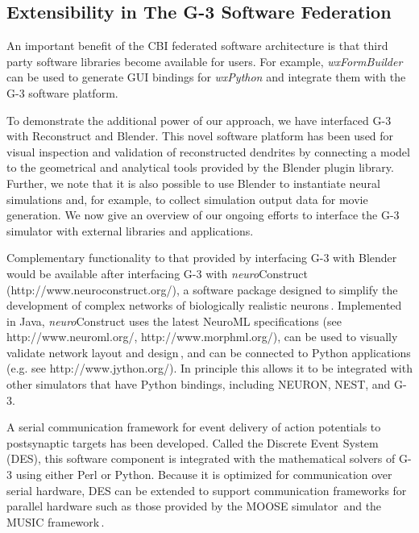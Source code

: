 \documentclass[12pt]{article}
\begin{document}
\subsection{Extensibility in The G-3 Software Federation}

An important benefit of the CBI federated software architecture is
that third party software libraries become available for users.  For
example, {\it wxFormBuilder} can be used to generate GUI bindings for
{\it wxPython} and integrate them with the G-3 software platform.

To demonstrate the additional power of our approach, we have
interfaced G-3 with Reconstruct and Blender. This novel software
platform has been used for visual inspection and validation of
reconstructed dendrites by connecting a model to the geometrical and
analytical tools provided by the Blender plugin library.  Further, we
note that it is also possible to use Blender to instantiate neural
simulations and, for example, to collect simulation output data for
movie generation.  We now give an overview of our ongoing efforts to
interface the G-3 simulator with external libraries and applications.

Complementary functionality to that provided by interfacing G-3 with
Blender would be available after interfacing G-3 with {\it
  neuro}Construct (http://www.neuroconstruct.org/), a software package
designed to simplify the development of complex networks of
biologically realistic neurons\,\cite{gleeson05:_build_networ_model,
  gleeson07}.  Implemented in Java, {\it neuro}Construct uses the
latest NeuroML specifications (see http://www.neuroml.org/,
http://www.morphml.org/), can be used to visually validate network
layout and design\,\cite{crook07:_morph}, and can be connected to
Python applications (e.g.  see http://www.jython.org/).  In principle
this allows it to be integrated with other simulators that have Python
bindings, including NEURON, NEST, and G-3.

A serial communication framework for event delivery of action
potentials to postsynaptic targets has been developed.  Called the
Discrete Event System (DES), this software component is integrated
with the mathematical solvers of G-3 using either Perl or Python.
Because it is optimized for communication over serial hardware, DES
can be extended to support communication frameworks for parallel
hardware such as those provided by the MOOSE
simulator\,\cite{ray08:_pymoos} and the MUSIC
framework\,\cite{djurfeldt10:_run_time_inter_between_neuron}.
\end{document}
